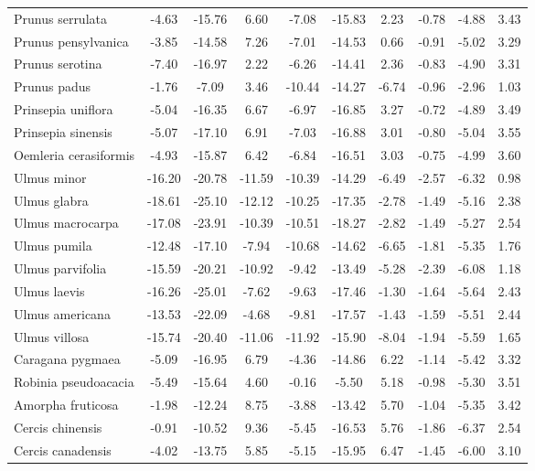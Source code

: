 \documentclass[11pt]{article}
\begin{document}
\begin{longtable}{p{1.50in}c{0.32in}c{0.32in}c{0.32in}c{0.32in}c{0.32in}c{0.32in}c{0.2in}c{0.3in}c{0.1in}}
  Prunus serrulata & -4.63 & -15.76 & 6.60 & -7.08 & -15.83 & 2.23 & -0.78 & -4.88 & 3.43 \\ 
  Prunus pensylvanica & -3.85 & -14.58 & 7.26 & -7.01 & -14.53 & 0.66 & -0.91 & -5.02 & 3.29 \\ 
  Prunus serotina & -7.40 & -16.97 & 2.22 & -6.26 & -14.41 & 2.36 & -0.83 & -4.90 & 3.31 \\ 
  Prunus padus & -1.76 & -7.09 & 3.46 & -10.44 & -14.27 & -6.74 & -0.96 & -2.96 & 1.03 \\ 
  Prinsepia uniflora & -5.04 & -16.35 & 6.67 & -6.97 & -16.85 & 3.27 & -0.72 & -4.89 & 3.49 \\ 
  Prinsepia sinensis & -5.07 & -17.10 & 6.91 & -7.03 & -16.88 & 3.01 & -0.80 & -5.04 & 3.55 \\ 
  Oemleria cerasiformis & -4.93 & -15.87 & 6.42 & -6.84 & -16.51 & 3.03 & -0.75 & -4.99 & 3.60 \\ 
  Ulmus minor & -16.20 & -20.78 & -11.59 & -10.39 & -14.29 & -6.49 & -2.57 & -6.32 & 0.98 \\ 
  Ulmus glabra & -18.61 & -25.10 & -12.12 & -10.25 & -17.35 & -2.78 & -1.49 & -5.16 & 2.38 \\ 
  Ulmus macrocarpa & -17.08 & -23.91 & -10.39 & -10.51 & -18.27 & -2.82 & -1.49 & -5.27 & 2.54 \\ 
  Ulmus pumila & -12.48 & -17.10 & -7.94 & -10.68 & -14.62 & -6.65 & -1.81 & -5.35 & 1.76 \\ 
  Ulmus parvifolia & -15.59 & -20.21 & -10.92 & -9.42 & -13.49 & -5.28 & -2.39 & -6.08 & 1.18 \\ 
  Ulmus laevis & -16.26 & -25.01 & -7.62 & -9.63 & -17.46 & -1.30 & -1.64 & -5.64 & 2.43 \\ 
  Ulmus americana & -13.53 & -22.09 & -4.68 & -9.81 & -17.57 & -1.43 & -1.59 & -5.51 & 2.44 \\ 
  Ulmus villosa & -15.74 & -20.40 & -11.06 & -11.92 & -15.90 & -8.04 & -1.94 & -5.59 & 1.65 \\ 
  Caragana pygmaea & -5.09 & -16.95 & 6.79 & -4.36 & -14.86 & 6.22 & -1.14 & -5.42 & 3.32 \\ 
  Robinia pseudoacacia & -5.49 & -15.64 & 4.60 & -0.16 & -5.50 & 5.18 & -0.98 & -5.30 & 3.51 \\ 
  Amorpha fruticosa & -1.98 & -12.24 & 8.75 & -3.88 & -13.42 & 5.70 & -1.04 & -5.35 & 3.42 \\ 
  Cercis chinensis & -0.91 & -10.52 & 9.36 & -5.45 & -16.53 & 5.76 & -1.86 & -6.37 & 2.54 \\ 
  Cercis canadensis & -4.02 & -13.75 & 5.85 & -5.15 & -15.95 & 6.47 & -1.45 & -6.00 & 3.10 \\ 

\end{longtable}
\end{document}
